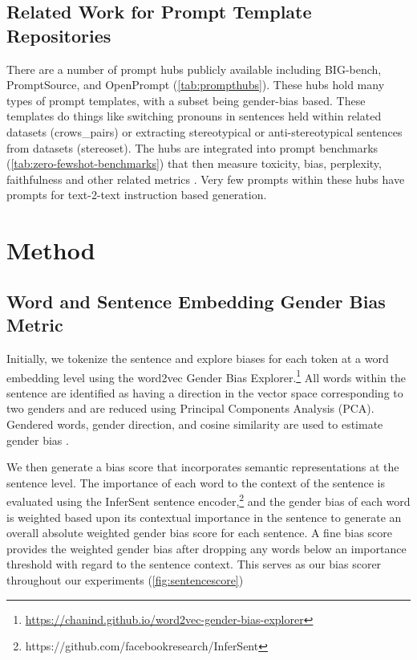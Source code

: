 \documentclass[11pt]{article}
\begin{document}
\subsection{Related Work for Prompt Template Repositories}
There are a number of prompt hubs publicly available including BIG-bench,  PromptSource, and OpenPrompt (\autoref{tab:prompthubs}). These hubs hold many types of prompt templates, with a subset being gender-bias based. These templates do things like switching pronouns in sentences held within related datasets (crows\_pairs) or extracting stereotypical or anti-stereotypical sentences from datasets (stereoset). The hubs are integrated into prompt benchmarks (\autoref{tab:zero-fewshot-benchmarks}) that then measure toxicity, bias, perplexity, faithfulness and other related metrics \citep{luo2021local:21}. Very few prompts within these hubs have prompts for text-2-text instruction based generation.

\section{Method}

\subsection{Word and Sentence Embedding Gender Bias Metric}

Initially, we tokenize the sentence and explore biases for each token at a word embedding level \citep{bolukbasi2016man:16} using the word2vec Gender Bias Explorer.\footnote{\url{https://chanind.github.io/word2vec-gender-bias-explorer}} All words within the sentence are identified as having a direction in the vector space corresponding to two genders and are reduced using Principal Components Analysis (PCA). Gendered words, gender direction, and cosine similarity are used to estimate gender bias \citep{Dolci-bias:21}.

We then generate a bias score that incorporates semantic representations at the sentence level. The importance of each word to the context of the sentence is evaluated using the InferSent  sentence encoder,\footnote{https://github.com/facebookresearch/InferSent} and the gender bias of each word is weighted based upon its contextual importance in the sentence to generate an overall absolute weighted gender bias score for each sentence. A fine bias score provides the weighted gender bias after dropping any words below an importance threshold with regard to the sentence context. This serves as our bias scorer throughout our experiments (\autoref{fig:sentencescore})
\end{document}
